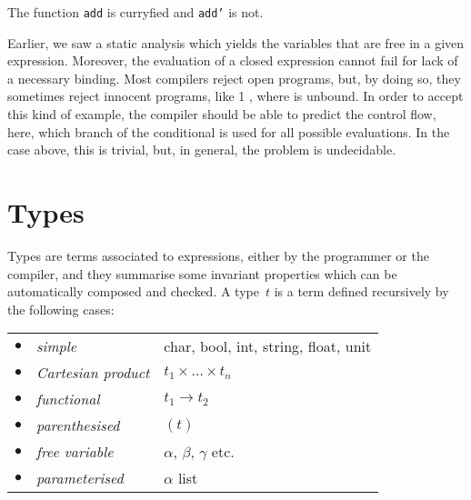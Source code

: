 \bigskip

\noindent{}

\noindent{}

\noindent{}

\noindent{}

\bigskip

\noindent The function \texttt{add} is curryfied and \texttt{add'} is
not.

Earlier, we saw a static analysis which yields the variables that are
free in a given expression. Moreover, the evaluation of a closed
expression cannot fail for lack of a necessary binding. Most compilers
reject open programs, but, by doing so, they sometimes reject innocent
programs, like \Xif{} \Xtrue{} \Xthen{} \num{1} \Xelse{} ,
where  is unbound. In order to accept this kind of example,
the compiler should be able to predict the control flow, here, which
branch of the conditional is used for all possible evaluations. In the
case above, this is trivial, but, in general, the problem is
undecidable.

\section{Types}

Types are terms associated to expressions, either by the programmer or
the compiler, and they summarise some invariant properties which can
be automatically composed and checked. A type~$t$ is a term defined
recursively by the following cases:

\bigskip

\begin{tabular}{rll}
    $\bullet$
  & \emph{simple}
  & \textsf{char}, \textsf{bool}, \textsf{int}, \textsf{string},
    \textsf{float}, \textsf{unit}\\
    $\bullet$
  & \emph{Cartesian product}
  & $t_1 \times \ldots \times t_n$\\
    $\bullet$
  & \emph{functional}
  & $t_1 \rightarrow t_2$\\
    $\bullet$
  & \emph{parenthesised}
  & $(t)$\\
    $\bullet$
  & \emph{free variable}
  & $\alpha$, $\beta$, $\gamma$ etc. \\
    $\bullet$
  & \emph{parameterised}
  & $\alpha$ \textsf{list}
\end{tabular}

